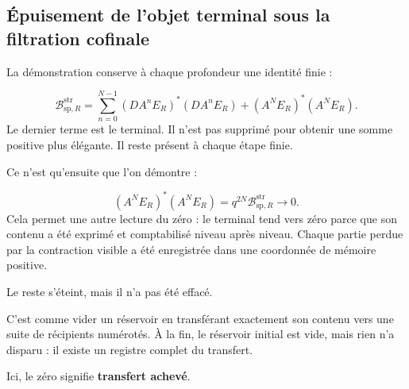 \subsection{Épuisement de l'objet terminal sous la filtration cofinale}
La démonstration conserve à chaque profondeur une identité finie :\par
\[
\mathcal B_{\mathrm{sp},R}^{\mathrm{str}}
=
\sum_{n=0}^{N-1}
(DA^nE_R)^*(DA^nE_R)
+
(A^NE_R)^*(A^NE_R).
\]
Le dernier terme est le terminal. Il n'est pas supprimé pour obtenir une somme positive plus élégante. Il reste présent à chaque étape finie.\par
Ce n'est qu'ensuite que l'on démontre :\par
\[
(A^NE_R)^*(A^NE_R)
=
q^{2N}
\mathcal B_{\mathrm{sp},R}^{\mathrm{str}}
\longrightarrow0.
\]
Cela permet une autre lecture du zéro : le terminal tend vers zéro parce que son contenu a été exprimé et comptabilisé niveau après niveau. Chaque partie perdue par la contraction visible a été enregistrée dans une coordonnée de mémoire positive.\par
Le reste s'éteint, mais il n'a pas été effacé.\par
C'est comme vider un réservoir en transférant exactement son contenu vers une suite de récipients numérotés. À la fin, le réservoir initial est vide, mais rien n'a disparu : il existe un registre complet du transfert.\par
Ici, le zéro signifie \textbf{transfert achevé}.\par
{}
